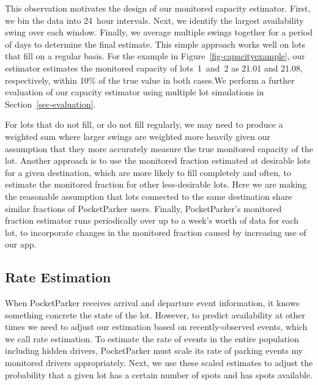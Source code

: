 This observation motivates the design of our monitored capacity estimator.
First, we bin the data into 24~hour intervals. Next, we identify the largest
availability swing over each window. Finally, we average multiple swings
together for a period of days to determine the final estimate. This simple
approach works well on lots that fill on a regular basis. For the example in
Figure~\ref{fig-capacityexample}, our estimator estimates the monitored
capacity of lots~1~and~2 as 21.01 and 21.08, respectively, within 10\% of the
true value in both cases.We perform a further evaluation of our capacity
estimator using multiple lot simulations in Section~\ref{sec-evaluation}.

For lots that do not fill, or do not fill regularly, we may need to produce a
weighted sum where larger swings are weighted more heavily given our
assumption that they more accurately measure the true monitored capacity of
the lot. Another approach is to use the monitored fraction estimated at
desirable lots for a given destination, which are more likely to fill
completely and often, to estimate the monitored fraction for other
less-desirable lots. Here we are making the reasonable assumption that lots
connected to the same destination share similar fractions of PocketParker
users. Finally, PocketParker's monitored fraction estimator runs periodically
over up to a week's worth of data for each lot, to incorporate changes in the
monitored fraction caused by increasing use of our app.

\subsection{Rate Estimation}
\label{subsec-rates}

When PocketParker receives arrival and departure event information, it knows
something concrete the state of the lot. However, to predict availability at
other times we need to adjust our estimation based on recently-observed
events, which we call rate estimation. To estimate the rate of events in the
entire population including hidden drivers, PocketParker must scale its rate
of parking events my monitored drivers appropriately. Next, we use these
scaled estimates to adjust the probability that a given lot has a certain
number of spots and has spots available.

